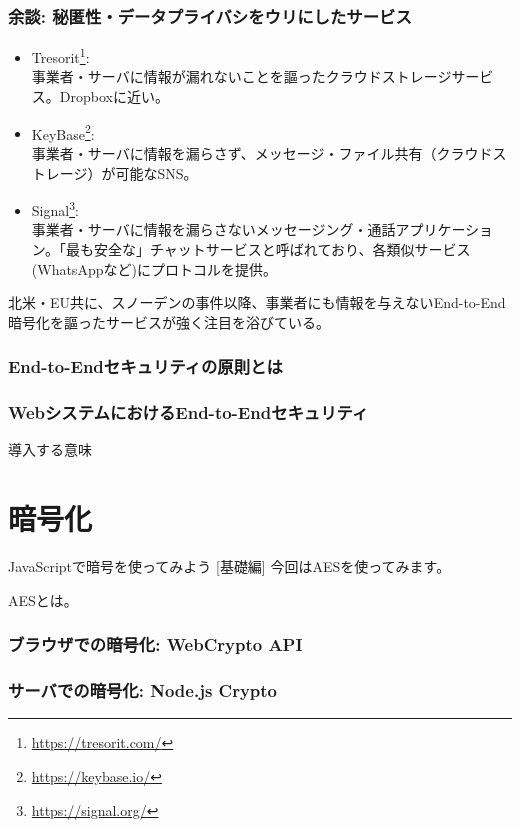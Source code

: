 \documentclass[12pt,dvipdfmx]{beamer}
\begin{document}
\begin{frame}
\frametitle{余談: 秘匿性・データプライバシをウリにしたサービス}
\small 
\begin{itemize}
\item Tresorit\footnote[frame]{\scriptsize \url{https://tresorit.com/}}:\\
事業者・サーバに情報が漏れないことを謳ったクラウドストレージサービス。Dropboxに近い。

\item KeyBase\footnote[frame]{\scriptsize \url{https://keybase.io/}}:\\
事業者・サーバに情報を漏らさず、メッセージ・ファイル共有（クラウドストレージ）が可能なSNS。

\item Signal\footnote[frame]{\scriptsize \url{https://signal.org/}}:\\
事業者・サーバに情報を漏らさないメッセージング・通話アプリケーション。「最も安全な」チャットサービスと呼ばれており、各類似サービス(WhatsAppなど)にプロトコルを提供。
\end{itemize}

北米・EU共に、スノーデンの事件以降、事業者にも情報を与えない\alert{End-to-End暗号化}を謳ったサービスが強く注目を浴びている。
\end{frame}

\begin{frame}
 \frametitle{End-to-Endセキュリティの原則とは}
\end{frame}

\begin{frame}
\frametitle{WebシステムにおけるEnd-to-Endセキュリティ}
導入する意味
\end{frame}

\section{暗号化}
\begin{frame}
\centering
{\Large JavaScriptで暗号を使ってみよう [基礎編]}
今回はAESを使ってみます。

AESとは。
\end{frame}

\begin{frame}
 \frametitle{ブラウザでの暗号化: WebCrypto API}
\end{frame}

\begin{frame}
 \frametitle{サーバでの暗号化: Node.js Crypto}
\end{frame}
\end{document}
